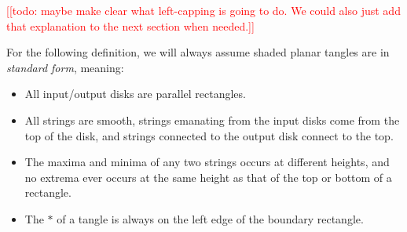 \documentclass[11pt]{article}
\theoremstyle{plain}
\theoremstyle{definition}
\newcommand{\nn}[1]{\textcolor{red}{[[#1]]}}
\begin{document}
\nn{todo: maybe make clear what left-capping is going to do. We could also just add that explanation to the next section when needed.}


For the following definition, we will always assume shaded planar tangles are in \textit{standard form}, meaning:
\begin{itemize}
\item All input/output disks are parallel rectangles.
\item All strings are smooth, strings emanating from the input disks come from the top of the disk, and strings connected to the output disk connect to the top.
\item The maxima and minima of any two strings occurs at different heights, and no extrema ever occurs at the same height as that of the top or bottom of a rectangle.
\item The $\ast$ of a tangle is always on the left edge of the boundary rectangle.
\end{itemize}
\end{document}
